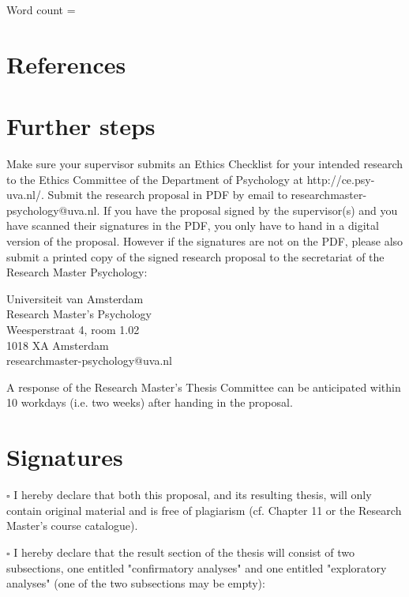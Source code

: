 \documentclass[12pt,a4paper]{article}
\begin{document}
Word count =

\renewcommand{\bibsection}{} %
\section{References}


\section{Further steps}
Make sure your supervisor submits an Ethics Checklist for your intended research to the Ethics Committee of the Department of Psychology at http://ce.psy-uva.nl/. Submit the research proposal in PDF by email to researchmaster-psychology@uva.nl. 
If you have the proposal signed by the supervisor(s) and you have scanned their signatures in the PDF, you only have to hand in a digital version of the proposal. However if the signatures are not on the PDF, please also submit a printed copy of the signed research proposal to the secretariat of the Research Master Psychology:
\vspace{\baselineskip}

Universiteit van Amsterdam \\
Research Master’s Psychology \\
Weesperstraat 4, room 1.02 \\
1018 XA Amsterdam \\
researchmaster-psychology@uva.nl
\vspace{\baselineskip}

A response of the Research Master's Thesis Committee can be anticipated within 10 workdays (i.e. two weeks) after handing in the proposal. 

\section{Signatures}
$\square$ I hereby declare that both this proposal, and its resulting thesis, will only contain original material and is free of plagiarism (cf. Chapter 11 or the Research Master's course catalogue).
\vspace{\baselineskip}

$\square$ I hereby declare that the result section of the thesis will consist of two subsections, one entitled "confirmatory analyses" and one entitled "exploratory analyses" (one of the two subsections may be empty):
\end{document}

